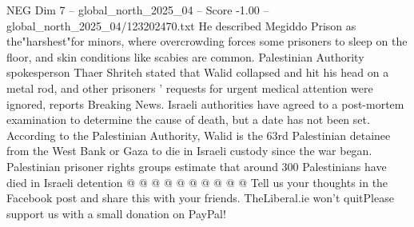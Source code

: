 \begin{textsample}{NEG Dim 7 – global\_north\_2025\_04 – Score -1.00 – global\_north\_2025\_04/123202470.txt}
He described Megiddo Prison as the"harshest"for minors, where overcrowding forces some prisoners to sleep on the floor, and skin conditions like scabies are common.
Palestinian Authority spokesperson Thaer Shriteh stated that Walid collapsed and hit his head on a metal rod, and other prisoners ' requests for urgent medical attention were ignored, reports Breaking News.
Israeli authorities have agreed to a post-mortem examination to determine the cause of death, but a date has not been set.
According to the Palestinian Authority, Walid is the 63rd Palestinian detainee from the West Bank or Gaza to die in Israeli custody since the war began.
Palestinian prisoner rights groups estimate that around 300 Palestinians have died in Israeli detention @ @ @ @ @ @ @ @ @ @ Tell us your thoughts in the Facebook post and share this with your friends.
TheLiberal.ie won't quitPlease support us with a small donation on PayPal!

\end{textsample}
